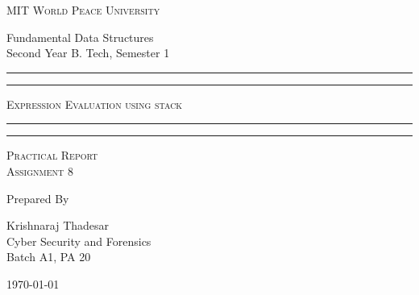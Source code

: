 \documentclass[11pt]{article}
\begin{document}
\begin{titlepage}
	\centering


	\huge\textsc{
		MIT World Peace University
	}\\

	\vspace{0.75\baselineskip} %

	\LARGE{
		Fundamental Data Structures\\
		Second Year B. Tech, Semester 1
	}

	\vfill %


	\rule{\textwidth}{1.6pt}\vspace*{-\baselineskip}\vspace*{2pt}
	\rule{\textwidth}{0.6pt}
	\vspace{0.75\baselineskip} %

	\huge{\textsc{
			Expression Evaluation using stack
		}} \\



	\vspace{0.5\baselineskip} %
	\rule{\textwidth}{0.6pt}\vspace*{-\baselineskip}\vspace*{2.8pt}
	\rule{\textwidth}{1.6pt}

	\vspace{1\baselineskip} %


	\LARGE\textsc{
		Practical Report\\
		Assignment 8
	} %
	\vfill


	Prepared By
	\vspace{0.5\baselineskip} %

	\Large{
		Krishnaraj Thadesar \\
		Cyber Security and Forensics\\
		Batch A1, PA 20
	}


	\vspace{0.5\baselineskip} %
	\today

\end{titlepage}
\end{document}

